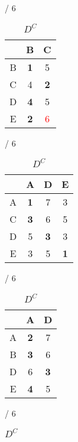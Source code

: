 \documentclass[a4paper, 11 pt, article, accentcolor=tud7b]{tudreport}
\begin{document}
  \begin{table}[h]
	  \begin{subtable}[b]{\textwidth / 6}
	    \begin{tabular}{| c | c | c |}
	      \hline
	        & B                   & C          \\ \hline
	      B & \textbf{1}          & 5          \\ \hline
	      C & 4                   & \textbf{2} \\ \hline
	      D & \textbf{4}          & 5          \\ \hline
	      E & \textbf{2}          & \textcolor{red}{6} \\ \hline
	    \end{tabular}
	    \caption{$D^{A}$}
	  \end{subtable}
	  \hfill
	  \begin{subtable}[b]{\textwidth / 6}
	    \begin{tabular}{| c | c | c | c |}
	    \hline
	      & A                   & D          & E                  \\ \hline
	    A & \textbf{1}          & 7          & 3                  \\ \hline
	    C & \textbf{3}          & 6          & 5                  \\ \hline
	    D & 5                   & \textbf{3} & 3                  \\ \hline
	    E & 3                   & 5          & \textbf{1}         \\ \hline
	    \end{tabular}
	    \caption{$D^{B}$}
	  \end{subtable}
	  \hfill
	  \begin{subtable}[b]{\textwidth / 6}
	    \begin{tabular}{| c | c | c |}
	    \hline
	      & A                   & D          \\ \hline
	    A & \textbf{2}          & 7          \\ \hline
	    B & \textbf{3}          & 6          \\ \hline
	    D & 6                   & \textbf{3} \\ \hline
	    E & \textbf{4}          & 5  \\ \hline
	    \end{tabular}
	    \caption{$D^{C}$}
	  \end{subtable}
    \hfill
	  \begin{subtable}[b]{\textwidth / 6}
	    \begin{tabular}{| c | c | c | c |}

\end{tabular}
\end{subtable}
\end{table}
\end{document}
